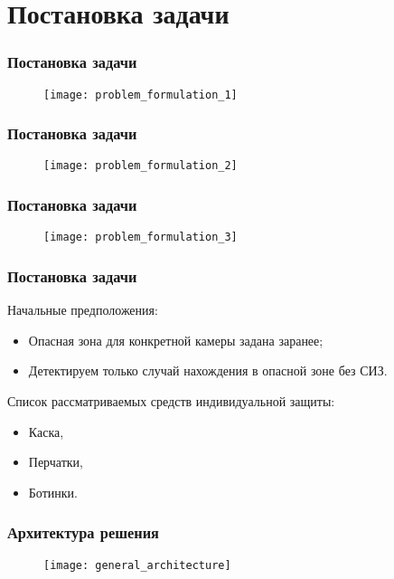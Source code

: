 \section{Постановка задачи}

\begin{frame}
    \frametitle{Постановка задачи}
    \begin{figure}
        \centering
        \texttt{[image: problem\_formulation\_1]}
    \end{figure}
\end{frame}

\begin{frame}
    \frametitle{Постановка задачи}
    \begin{figure}
        \centering
        \texttt{[image: problem\_formulation\_2]}
    \end{figure}
\end{frame}

\begin{frame}
    \frametitle{Постановка задачи}
    \begin{figure}
        \centering
        \texttt{[image: problem\_formulation\_3]}
    \end{figure}
\end{frame}

\begin{frame}
    \frametitle{Постановка задачи}
    Начальные предположения:
    \begin{itemize}
        \item Опасная зона для конкретной камеры задана заранее;
        \item Детектируем только случай нахождения в опасной зоне без СИЗ.
    \end{itemize}

    Список рассматриваемых средств индивидуальной защиты:
    \begin{itemize}
        \item Каска,
        \item Перчатки,
        \item Ботинки.
    \end{itemize}
\end{frame}

\begin{frame}
    \frametitle{Архитектура решения}
    \begin{figure}
        \centering
        \texttt{[image: general\_architecture]}
    \end{figure}
\end{frame}

